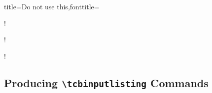 \begin{dispListing*}{title={Do not use this},fonttitle=\bfseries}

\begin{mybox}[colframe=red]
\good
\end{mybox}

\begin{mybox}[colframe=red]\good\end{mybox}

\begin{mybox}
\bad!
\end{mybox}

\begin{mybox} \bad!\end{mybox}

\begin{mybox}\bad!\end{mybox}

\begin{mybox}
[\bad!]
\end{mybox}

\begin{mybox} [\bad!]\end{mybox}

\begin{mybox}[\bad!]\end{mybox}
\end{dispListing*}


\clearpage
\subsection{Producing \texttt{\textbackslash tcbinputlisting} Commands}\label{subsec:listings_inputlisting}
\enlargethispage*{1cm}

